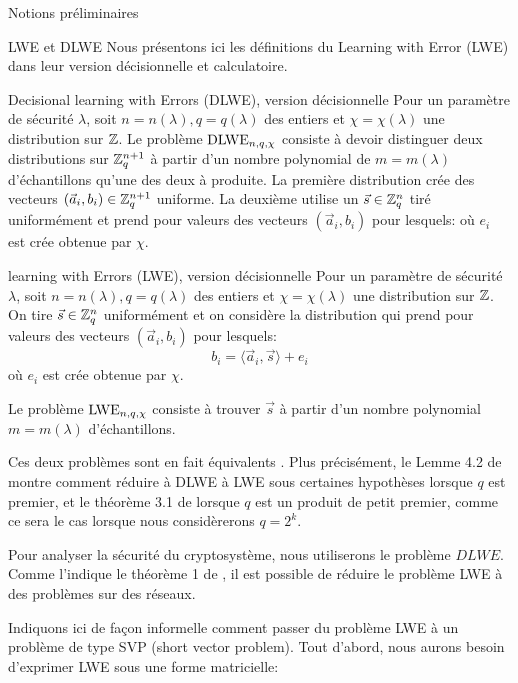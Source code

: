 \begin{section}{Notions préliminaires}
	\begin{subsection}{LWE et DLWE}
	Nous présentons ici les définitions du Learning with Error
	(LWE) dans leur version décisionnelle et calculatoire.
	
	\begin{definition}{Decisional learning with Errors (DLWE), version décisionnelle}
	Pour un paramètre de sécurité $\lambda$, soit $n = n(\lambda),q = q(\lambda)$ 
	des entiers et $\chi = \chi(\lambda)$ une
	distribution sur $\mathbb{Z}$.
	Le problème $\text{DLWE}_{n,q,\chi}$ consiste à devoir distinguer 
	deux distributions sur $\mathbb{Z}_q^{n+1}$ à partir d'un nombre polynomial
	de $m = m(\lambda)$ d'échantillons qu'une des deux à produite.
	La première distribution crée des vecteurs $(\vec{a}_i,b_i) \in
	\mathbb{Z}_q^{n+1}$ uniforme.
	La deuxième utilise un $\vec{s} \in \mathbb{Z}_q^n$ tiré uniformément et 
	prend pour valeurs des vecteurs $(\vec{a}_i, b_i)$ pour lesquels:
	où $e_i$ est crée obtenue par $\chi$.
	\end{definition}

	\begin{definition}{learning with Errors (LWE), version décisionnelle}
	Pour un paramètre de sécurité $\lambda$, soit $n = n(\lambda),q = q(\lambda)$ 
	des entiers et $\chi = \chi(\lambda)$ une
	distribution sur $\mathbb{Z}$. On tire $\vec{s} \in \mathbb{Z}_q^n$ uniformément 
	et on considère la distribution qui  
	prend pour valeurs des vecteurs $(\vec{a}_i, b_i)$ pour lesquels:
		\[ b_i = \langle \vec{a}_i, \vec{s} \rangle + e_i \]
	où $e_i$ est crée obtenue par $\chi$.

	Le problème $\text{LWE}_{n,q,\chi}$ consiste à trouver $\vec{s}$ à partir d'un nombre
	polynomial $m = m(\lambda)$ d'échantillons.
	\end{definition}

	Ces deux problèmes sont en fait \og équivalents \fg. Plus précisément, 
	le Lemme 4.2 de \cite{STOC:Regev05} montre comment réduire à
	DLWE à LWE sous certaines hypothèses lorsque $q$ est premier, et 
	le théorème 3.1 de \cite{EPRINT:MicPei11} lorsque $q$ est un produit 
	de petit premier, comme ce sera le cas lorsque nous considèrerons 
	$q = 2^k$.

	
	Pour analyser la sécurité du cryptosystème, nous utiliserons le
	problème $DLWE$. 
	Comme l'indique le théorème 1 de \cite{C:GenSahWat13}, il est
	possible de réduire le problème LWE à des problèmes sur des réseaux.


	Indiquons ici de façon informelle comment passer du problème LWE à un 
	problème de type SVP (short vector problem).
	Tout d'abord, nous aurons besoin d'exprimer LWE sous une forme
	matricielle:


\end{subsection}
\end{section}

